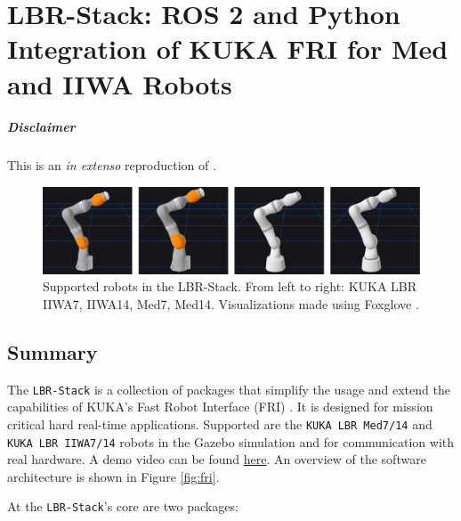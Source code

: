 \chapter[LBR-Stack]{LBR-Stack: ROS 2 and Python Integration of KUKA FRI for Med and
IIWA Robots}
\label{app:lbr_stack}
\minitoc

\paragraph{Disclaimer} This  is an \textit{in extenso} reproduction of \cite{huber2023lbr}.

\newpage

\begin{figure}
\centering
\includegraphics[width=\textwidth]{appendix_a/img/joss_figure.png}
\caption[Supported robots in the LBR-Stack. From left to right: KUKA LBR
IIWA7, IIWA14, Med7, Med14. Visualizations made using Foxglove
.]{Supported robots in the LBR-Stack. From left to right: KUKA LBR
IIWA7, IIWA14, Med7, Med14. Visualizations made using Foxglove
\footnotemark{}.}
\end{figure}

\hypertarget{summary}{%
\section{Summary}\label{summary}}
The \texttt{LBR-Stack} is a collection of packages that simplify the
usage and extend the capabilities of KUKA's Fast Robot Interface (FRI)
\cite{ref-fri}. It is designed
for mission critical hard real-time applications. Supported are the
\texttt{KUKA\ LBR\ Med7/14} and \texttt{KUKA\ LBR\ IIWA7/14} robots in
the Gazebo simulation \cite{ref-gazebo} and for communication with real hardware. A demo video can be
found
\href{https://www.linkedin.com/posts/mhubii_robotics-opensource-ros2-activity-7009974676017848320-S3U5/?utm_source=share\&utm_medium=member_desktop}{here}.
An overview of the software architecture is shown in Figure
\ref{fig:fri}.

At the \texttt{LBR-Stack}'s core are two packages:


